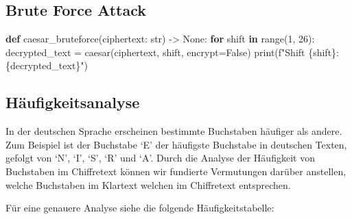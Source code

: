 \documentclass[
  nswissgerman,
  a4paper,
  DIV=11,
  numbers=noendperiod,
  ngerman]{scrreprt}
\newenvironment{Shaded}{\begin{snugshade}}{\end{snugshade}}
\newcommand{\BuiltInTok}[1]{\textcolor[rgb]{0.00,0.23,0.31}{#1}}
\newcommand{\ControlFlowTok}[1]{\textcolor[rgb]{0.00,0.23,0.31}{\textbf{#1}}}
\newcommand{\DecValTok}[1]{\textcolor[rgb]{0.68,0.00,0.00}{#1}}
\newcommand{\KeywordTok}[1]{\textcolor[rgb]{0.00,0.23,0.31}{\textbf{#1}}}
\newcommand{\NormalTok}[1]{\textcolor[rgb]{0.00,0.23,0.31}{#1}}
\newcommand{\OperatorTok}[1]{\textcolor[rgb]{0.37,0.37,0.37}{#1}}
\newcommand{\SpecialCharTok}[1]{\textcolor[rgb]{0.37,0.37,0.37}{#1}}
\newcommand{\SpecialStringTok}[1]{\textcolor[rgb]{0.13,0.47,0.30}{#1}}
\newcommand{\VariableTok}[1]{\textcolor[rgb]{0.07,0.07,0.07}{#1}}
\begin{document}
\subsection{Brute Force Attack}\label{brute-force-attack}

\begin{Shaded}
\begin{Highlighting}[numbers=left,,]
\KeywordTok{def}\NormalTok{ caesar\_bruteforce(ciphertext: }\BuiltInTok{str}\NormalTok{) }\OperatorTok{{-}\textgreater{}} \VariableTok{None}\NormalTok{:}
    \ControlFlowTok{for}\NormalTok{ shift }\KeywordTok{in} \BuiltInTok{range}\NormalTok{(}\DecValTok{1}\NormalTok{, }\DecValTok{26}\NormalTok{):}
\NormalTok{        decrypted\_text }\OperatorTok{=}\NormalTok{ caesar(ciphertext, shift, encrypt}\OperatorTok{=}\VariableTok{False}\NormalTok{)}
        \BuiltInTok{print}\NormalTok{(}\SpecialStringTok{f"Shift }\SpecialCharTok{\{}\NormalTok{shift}\SpecialCharTok{\}}\SpecialStringTok{: }\SpecialCharTok{\{}\NormalTok{decrypted\_text}\SpecialCharTok{\}}\SpecialStringTok{"}\NormalTok{)}
\end{Highlighting}
\end{Shaded}

\subsection{Häufigkeitsanalyse}\label{huxe4ufigkeitsanalyse}

In der deutschen Sprache erscheinen bestimmte Buchstaben häufiger als
andere. Zum Beispiel ist der Buchstabe `E' der häufigste Buchstabe in
deutschen Texten, gefolgt von `N', `I', `S', `R' und `A'. Durch die
Analyse der Häufigkeit von Buchstaben im Chiffretext können wir
fundierte Vermutungen darüber anstellen, welche Buchstaben im Klartext
welchen im Chiffretext entsprechen.

Für eine genauere Analyse siehe die folgende Häufigkeitstabelle:
\end{document}
